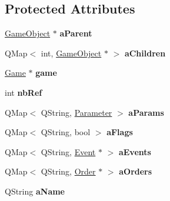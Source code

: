 \subsection*{\-Protected \-Attributes}
\begin{DoxyCompactItemize}
\item 
\hypertarget{class_game_object_a6dc6afadfe70d15d9371d3271d2d7dc6}{\hyperlink{class_game_object}{\-Game\-Object} $\ast$ {\bfseries a\-Parent}}\label{class_game_object_a6dc6afadfe70d15d9371d3271d2d7dc6}

\item 
\hypertarget{class_game_object_ac0f8f486901d9e799b8d171ad26742ad}{\-Q\-Map$<$ int, \hyperlink{class_game_object}{\-Game\-Object} $\ast$ $>$ {\bfseries a\-Children}}\label{class_game_object_ac0f8f486901d9e799b8d171ad26742ad}

\item 
\hypertarget{class_game_object_a338ed91d0ad6aebe8a8d3adf8c75752b}{\hyperlink{class_game}{\-Game} $\ast$ {\bfseries game}}\label{class_game_object_a338ed91d0ad6aebe8a8d3adf8c75752b}

\item 
\hypertarget{class_game_object_a1873810f18db1e1faecc04e0ab92c512}{int {\bfseries nb\-Ref}}\label{class_game_object_a1873810f18db1e1faecc04e0ab92c512}

\item 
\hypertarget{class_game_object_a5fceca16ad7b10dd465a8a13eb155eb6}{\-Q\-Map$<$ \-Q\-String, \hyperlink{class_parameter}{\-Parameter} $>$ {\bfseries a\-Params}}\label{class_game_object_a5fceca16ad7b10dd465a8a13eb155eb6}

\item 
\hypertarget{class_game_object_ade46e4f590a01cab331d12d0da644625}{\-Q\-Map$<$ \-Q\-String, bool $>$ {\bfseries a\-Flags}}\label{class_game_object_ade46e4f590a01cab331d12d0da644625}

\item 
\hypertarget{class_game_object_a98554b4f60309d14061aaa1afff4f41e}{\-Q\-Map$<$ \-Q\-String, \hyperlink{class_event}{\-Event} $\ast$ $>$ {\bfseries a\-Events}}\label{class_game_object_a98554b4f60309d14061aaa1afff4f41e}

\item 
\hypertarget{class_game_object_a125542c68c747bb3401346ff36c0601f}{\-Q\-Map$<$ \-Q\-String, \hyperlink{class_order}{\-Order} $\ast$ $>$ {\bfseries a\-Orders}}\label{class_game_object_a125542c68c747bb3401346ff36c0601f}

\item 
\hypertarget{class_game_object_aad00b615f4d3c6d4d743ff2f8c27a359}{\-Q\-String {\bfseries a\-Name}}\label{class_game_object_aad00b615f4d3c6d4d743ff2f8c27a359}


\end{DoxyCompactItemize}
